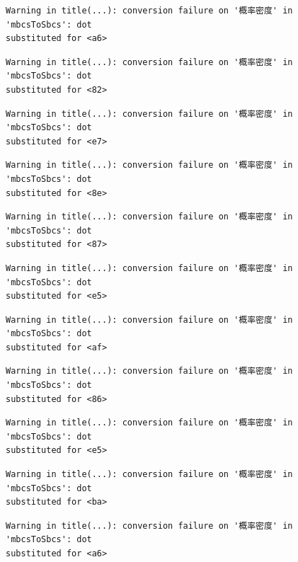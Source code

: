 \documentclass[
  letterpaper,
  DIV=11,
  numbers=noendperiod]{scrreprt}
\begin{document}
\begin{verbatim}
Warning in title(...): conversion failure on '概率密度' in 'mbcsToSbcs': dot
substituted for <a6>
\end{verbatim}

\begin{verbatim}
Warning in title(...): conversion failure on '概率密度' in 'mbcsToSbcs': dot
substituted for <82>
\end{verbatim}

\begin{verbatim}
Warning in title(...): conversion failure on '概率密度' in 'mbcsToSbcs': dot
substituted for <e7>
\end{verbatim}

\begin{verbatim}
Warning in title(...): conversion failure on '概率密度' in 'mbcsToSbcs': dot
substituted for <8e>
\end{verbatim}

\begin{verbatim}
Warning in title(...): conversion failure on '概率密度' in 'mbcsToSbcs': dot
substituted for <87>
\end{verbatim}

\begin{verbatim}
Warning in title(...): conversion failure on '概率密度' in 'mbcsToSbcs': dot
substituted for <e5>
\end{verbatim}

\begin{verbatim}
Warning in title(...): conversion failure on '概率密度' in 'mbcsToSbcs': dot
substituted for <af>
\end{verbatim}

\begin{verbatim}
Warning in title(...): conversion failure on '概率密度' in 'mbcsToSbcs': dot
substituted for <86>
\end{verbatim}

\begin{verbatim}
Warning in title(...): conversion failure on '概率密度' in 'mbcsToSbcs': dot
substituted for <e5>
\end{verbatim}

\begin{verbatim}
Warning in title(...): conversion failure on '概率密度' in 'mbcsToSbcs': dot
substituted for <ba>
\end{verbatim}

\begin{verbatim}
Warning in title(...): conversion failure on '概率密度' in 'mbcsToSbcs': dot
substituted for <a6>
\end{verbatim}
\end{document}
